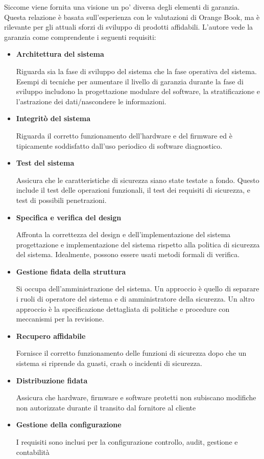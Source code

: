 Siccome viene fornita una visione un po' diversa degli elementi di garanzia. Questa relazione è basata sull'esperienza con le valutazioni di Orange Book, ma è rilevante per gli attuali sforzi di sviluppo di prodotti affidabili. 
L'autore vede la garanzia come comprendente i seguenti requisiti:

\begin{itemize}
    \item \textbf{Architettura del sistema} 
    
    Riguarda sia la fase di sviluppo del sistema che la fase operativa del sistema. Esempi di tecniche per aumentare il livello di garanzia durante la fase di sviluppo includono la progettazione modulare del software, la stratificazione e l'astrazione dei dati/nascondere le informazioni.
    
    \item\textbf{Integritò del sistema}
    
    Riguarda il corretto funzionamento dell'hardware e del firmware ed è tipicamente soddisfatto dall'uso periodico di software diagnostico.
    
    \item \textbf{Test del sistema}
    
    Assicura che le caratteristiche di sicurezza siano state testate a fondo. Questo include il test delle operazioni funzionali, il test dei requisiti di sicurezza, e test di possibili penetrazioni.
    
    \item \textbf{Specifica e verifica del design}
    
    Affronta la correttezza del design e dell'implementazione del sistema progettazione e implementazione del sistema rispetto alla politica di sicurezza del sistema. Idealmente, possono essere usati metodi formali di verifica.
    
    \item \textbf{Gestione fidata della struttura}
    
    Si occupa dell'amministrazione del sistema. Un approccio è quello di separare i ruoli di operatore del sistema e di amministratore della sicurezza. Un altro approccio è la specificazione dettagliata di politiche e procedure con meccanismi per la revisione.
    
    \item \textbf{Recupero affidabile}
    
    Fornisce il corretto funzionamento delle funzioni di sicurezza dopo che un sistema si riprende da guasti, crash o incidenti di sicurezza.
    
    \item \textbf{Distribuzione fidata}
    
    Assicura che hardware, firmware e software protetti non subiscano modifiche non autorizzate durante il transito dal fornitore al cliente
     
    \item \textbf{Gestione della configurazione}
     
    I requisiti sono inclusi per la configurazione controllo, audit, gestione e contabilità
\end{itemize}
